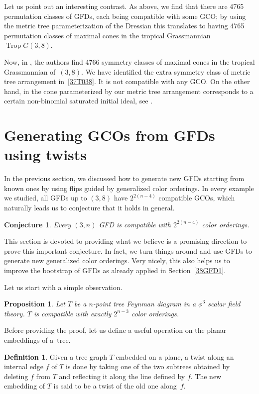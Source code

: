 \documentclass[pdftex]{sigma}
\newtheorem{prop}[thm]{Proposition}
\newtheorem{conj}[thm]{Conjecture}
\theoremstyle{definition}
\newtheorem{defn}[thm]{Definition}
\numberwithin{equation}{section}
\begin{document}
Let us point out an interesting contrast. As above, we find that there are 4765 permutation classes of GFDs, each being compatible with some GCO; by using the metric tree parameterization of the Dressian this translates to having 4765 permutation classes of maximal cones in the tropical Grassmannian $\operatorname{Trop} G(3,8)$.

Now, in \cite[Theorem~4.6]{bendle2020parallel}, the authors find 4766 symmetry classes of maximal cones in the tropical Grassmannian of~$(3,8)$. We have identified the extra symmetry class of metric tree arrangement in~\eqref{37T038}. It is not compatible with any GCO. On the other hand, in \cite{bendle2020parallel} the cone parameterized by our metric tree arrangement corresponds to a certain non-binomial saturated initial ideal, see \cite[Remark~4.5]{bendle2020parallel}.

\section{Generating GCOs from GFDs using twists} \label{poletoGCO}

In the previous section, we discussed how to generate new GFDs starting from known ones by using flips guided by generalized color orderings. In every example we studied, all GFDs up to $(3,8)$ have $2^{2(n-4)}$ compatible GCOs, which naturally leads us to conjecture that it holds in general.

\begin{conj}\label{samenumber}
Every $(3,n)$ GFD is compatible with $2^{2(n-4)}$ color orderings.
\end{conj}

This section is devoted to providing what we believe is a promising direction to prove this important conjecture. In fact, we turn things around and use GFDs to generate new generalized color orderings. Very nicely, this also helps us to improve the bootstrap of GFDs as already applied in Section~\ref{38GFD1}.

Let us start with a simple observation.

\begin{prop}\label{k2CO}
 Let $T$ be a $n$-point tree Feynman diagram in a $\phi^3$ scalar field theory. $T$ is compatible with exactly $2^{n-3}$ color orderings.
\end{prop}

Before providing the proof, let us define a useful operation on the planar embeddings of a~tree.

\begin{defn}
Given a tree graph $T$ embedded on a plane, a twist along an internal edge $f$ of $T$ is done by taking one of the two subtrees obtained by deleting $f$ from $T$ and reflecting it along the line defined by $f$. The new embedding of $T$ is said to be a twist of the old one along~$f$.
\end{defn}
\end{document}
